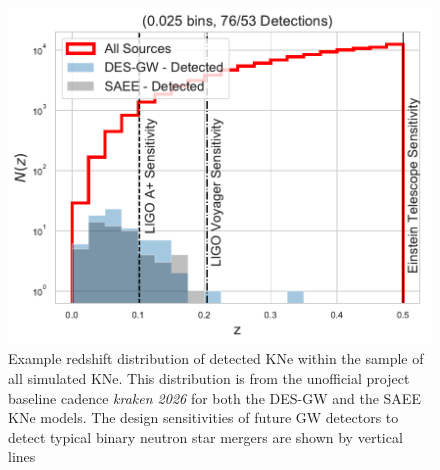 \begin{figure}[h!]
  \centering
  \includegraphics[scale=0.82]{figures/both_nz_base_kraken_2026}
  \caption{Example redshift distribution of detected KNe within the sample of all simulated KNe. This distribution is from the unofficial project baseline cadence \protect \textit{kraken 2026} for both the DES-GW and the SAEE KNe models. The design sensitivities of future GW detectors to detect typical binary neutron star mergers are shown by vertical lines \citep{Chen2017a, Chamberlain2017, Scolnic2017a}}
  \label{fig:typical_nz}
\end{figure}

\FloatBarrier
